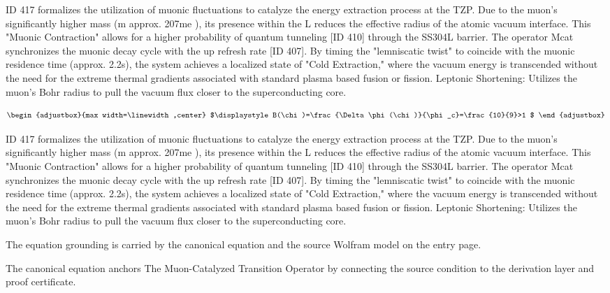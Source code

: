 ID 417 formalizes the utilization of muonic fluctuations to catalyze the energy extraction process at the TZP. Due to the muon's significantly higher mass (m approx. 207me ), its presence within the L reduces the effective radius of the atomic vacuum interface. This "Muonic Contraction" allows for a higher probability of quantum tunneling [ID 410] through the SS304L barrier. The operator Mcat synchronizes the muonic decay cycle with the up refresh rate [ID 407]. By timing the "lemniscatic twist" to coincide with the muonic residence time (approx. 2.2s), the system achieves a localized state of "Cold Extraction," where the vacuum energy is transcended without the need for the extreme thermal gradients associated with standard plasma based fusion or fission. Leptonic Shortening: Utilizes the muon's Bohr radius to pull the vacuum flux closer to the superconducting core.

\[
\begin{adjustbox}{max width=\linewidth,center}
$\displaystyle
B(\chi)=\frac{\Delta\phi(\chi)}{\phi_c}=\frac{10}{9}>1
$
\end{adjustbox}
\]

ID 417 formalizes the utilization of muonic fluctuations to catalyze the energy extraction process at the TZP. Due to the muon's significantly higher mass (m approx. 207me ), its presence within the L reduces the effective radius of the atomic vacuum interface. This "Muonic Contraction" allows for a higher probability of quantum tunneling [ID 410] through the SS304L barrier. The operator Mcat synchronizes the muonic decay cycle with the up refresh rate [ID 407]. By timing the "lemniscatic twist" to coincide with the muonic residence time (approx. 2.2s), the system achieves a localized state of "Cold Extraction," where the vacuum energy is transcended without the need for the extreme thermal gradients associated with standard plasma based fusion or fission. Leptonic Shortening: Utilizes the muon's Bohr radius to pull the vacuum flux closer to the superconducting core.

The equation grounding is carried by the canonical equation and the source Wolfram model on the entry page.

The canonical equation anchors The Muon-Catalyzed Transition Operator by connecting the source condition to the derivation layer and proof certificate.

